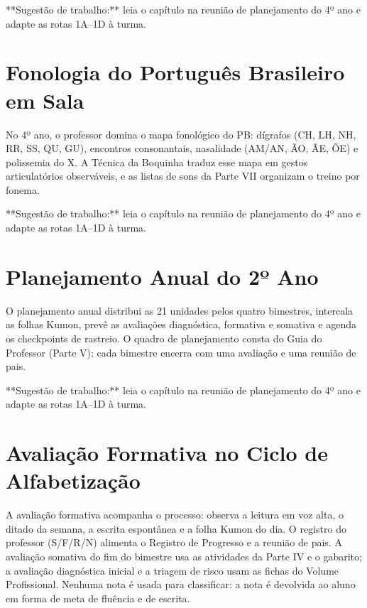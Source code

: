 \begin{dica}
**Sugestão de trabalho:** leia o capítulo na reunião de planejamento do 4º ano e adapte as rotas 1A–1D à turma.
\end{dica}

\chapter{Fonologia do Português Brasileiro em Sala}

No 4º ano, o professor domina o mapa fonológico do PB: dígrafos (CH, LH, NH, RR, SS, QU, GU), encontros consonantais, nasalidade (AM/AN, ÃO, ÃE, ÕE) e polissemia do X. A Técnica da Boquinha traduz esse mapa em gestos articulatórios observáveis, e as listas de sons da Parte VII organizam o treino por fonema.


\begin{dica}
**Sugestão de trabalho:** leia o capítulo na reunião de planejamento do 4º ano e adapte as rotas 1A–1D à turma.
\end{dica}

\chapter{Planejamento Anual do 2º Ano}

O planejamento anual distribui as 21 unidades pelos quatro bimestres, intercala as folhas Kumon, prevê as avaliações diagnóstica, formativa e somativa e agenda os checkpoints de rastreio. O quadro de planejamento consta do Guia do Professor (Parte V); cada bimestre encerra com uma avaliação e uma reunião de pais.


\begin{dica}
**Sugestão de trabalho:** leia o capítulo na reunião de planejamento do 4º ano e adapte as rotas 1A–1D à turma.
\end{dica}

\chapter{Avaliação Formativa no Ciclo de Alfabetização}

A avaliação formativa acompanha o processo: observa a leitura em voz alta, o ditado da semana, a escrita espontânea e a folha Kumon do dia. O registro do professor (S/F/R/N) alimenta o Registro de Progresso e a reunião de pais. A avaliação somativa do fim do bimestre usa as atividades da Parte IV e o gabarito; a avaliação diagnóstica inicial e a triagem de risco usam as fichas do Volume Profissional. Nenhuma nota é usada para classificar: a nota é devolvida ao aluno em forma de meta de fluência e de escrita.


